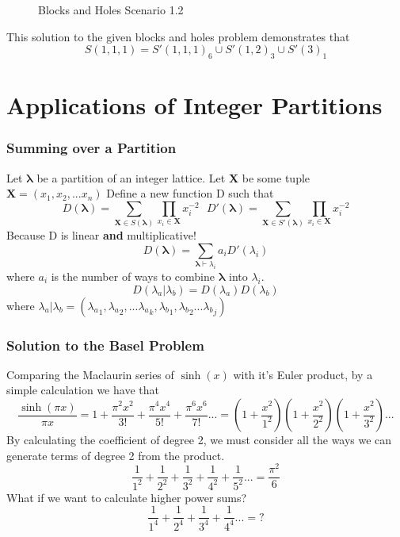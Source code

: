 \documentclass{beamer}
\begin{document}
\begin{frame}
\begin{figure}[ht]
  	\caption{Blocks and Holes Scenario 1.2}
  \end{figure}
  This solution to the given blocks and holes problem demonstrates that
    \[S(1,1,1) = S'(1,1,1)_6 \cup S'(1,2)_3 \cup S'(3)_1\]
\end{frame}

\section{Applications of Integer Partitions}

\begin{frame}
  \frametitle{Summing over a Partition}
Let \(\boldsymbol{\lambda}\) be a partition of an integer lattice.
\newline
Let \textbf{X} be some tuple \(\textbf{X}=(x_1,x_2,...x_n)\)
\newline
Define a new function D such that
\[D(\boldsymbol{\lambda}) = \sum_{\textbf{X}\in S(\boldsymbol{\lambda})}\prod_{x_i \in \textbf{X}}x_i^{-2}\ \ \ D'(\boldsymbol{\lambda}) = \sum_{\textbf{X}\in S'(\boldsymbol{\lambda})}\prod_{x_i \in \textbf{X}}x_i^{-2}\]
Because D is linear \textbf{and} multiplicative!
\[D(\boldsymbol{\lambda}) = \sum_{ \boldsymbol{\lambda} \vdash \lambda_i}a_iD'(\lambda_i)\]
where \(a_i\) is the number of ways to combine \(\boldsymbol{\lambda}\) into \(\lambda_i\).
\newline \newline
\[D(\lambda_a|\lambda_b) = D{(\lambda_a)}D{(\lambda_b)}\]
where \(\lambda_a|\lambda_b = ({\lambda_a}_1,{\lambda_a}_2,...{\lambda_a}_k,{\lambda_b}_1,{\lambda_b}_2...{\lambda_b}_j)\)
\end{frame}

\begin{frame}
  \frametitle{Solution to the Basel Problem}
  \newline \newline
  Comparing the Maclaurin series of \(\sinh(x)\) with it's Euler product, by a simple calculation we have that
  \[\frac{\sinh(\pi x)}{\pi x} = 1 + \frac{\pi^2x^2}{3!}+\frac{\pi^4x^4}{5!}+\frac{\pi^6x^6}{7!}...=\left(1+\frac{x^2}{1^2}\right)\left(1+\frac{x^2}{2^2}\right)\left(1+\frac{x^2}{3^2}\right)...\]
  By calculating the coefficient of degree 2, we must consider all the ways we can generate terms of degree 2 from the product.
  \[\frac{1}{1^2} + \frac{1}{2^2} + \frac{1}{3^2} + \frac{1}{4^2} + \frac{1}{5^2}... = \frac{\pi^2}{6}\]
  \newline
  What if we want to calculate higher power sums?
  \[\frac{1}{1^4} + \frac{1}{2^4} + \frac{1}{3^4} + \frac{1}{4^4}... = ?\]
\end{frame}
\end{document}
